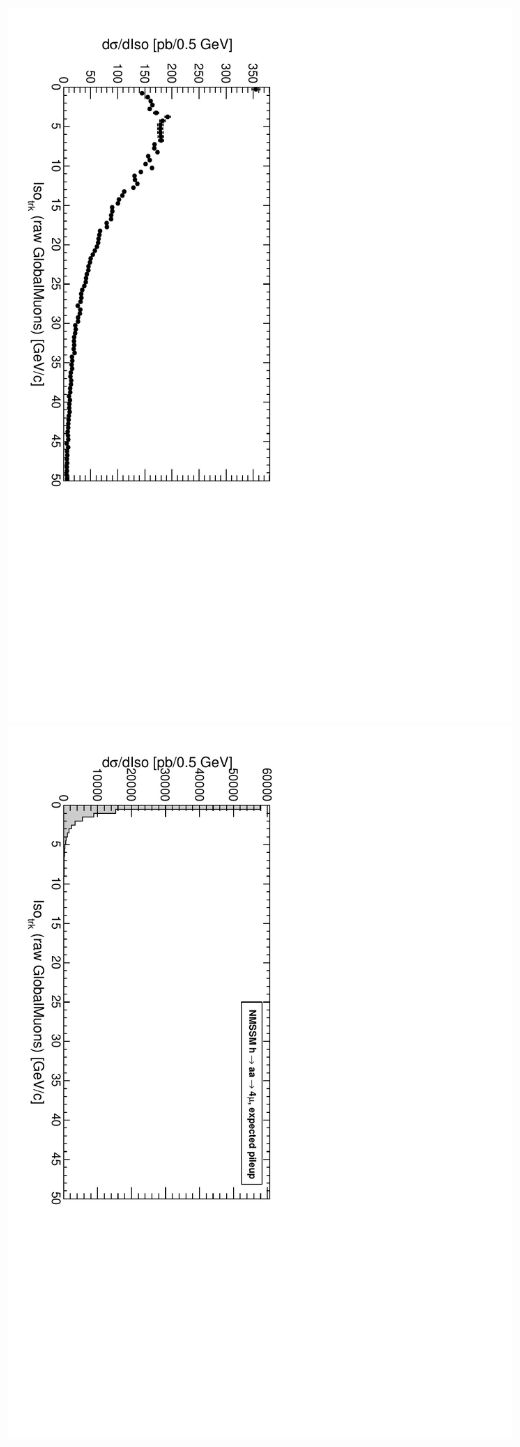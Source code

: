 \documentclass[compress]{beamer}
\begin{document}
\begin{frame}
\includegraphics[height=0.5\linewidth, angle=90]{tkisolation_PlainGlobalMuonAny.pdf}
\includegraphics[height=0.5\linewidth, angle=90]{tkisolation_PlainGlobalMuonAny_NMSSM.pdf}
\end{frame}
\end{document}
